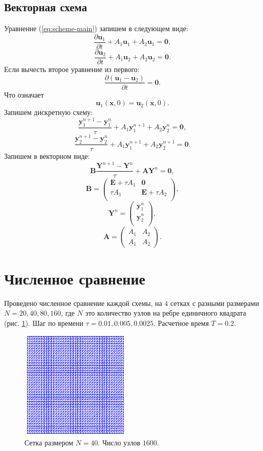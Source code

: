 \documentclass[12pt]{article}
\begin{document}
\subsection{Векторная схема}
Уравнение (\ref{eq:scheme-main}) запишем в следующем виде:
$$\frac{\partial {\bm u}_1}{\partial t} + A_1{\bm u}_1 + A_2{\bm u}_1 = {\bm 0},$$
$$\frac{\partial {\bm u}_2}{\partial t} + A_1{\bm u}_2 + A_2{\bm u}_2 = {\bm 0}.$$
Если вычесть второе уравнение из первого:
$$
\frac{\partial ({\bm u}_1 - {\bm u}_2)}{\partial t} = {\bm 0}.
$$
Что означает $${\bm u}_1 ({\bm x}, 0) = {\bm u}_2 ({\bm x}, 0).$$
Запишем дискретную схему:
$$\frac{{\bm y}_{1}^{n+1} - {\bm y}_{1}^{n} }{\tau} + A_1 {\bm y}_1^{n+1} + A_2 {\bm y}_2^n = {\bm 0},$$
$$\frac{{\bm y}_{2}^{n+1} - {\bm y}_{2}^{n} }{\tau} + A_1 {\bm y}_1^{n+1} + A_2 {\bm y}_2^{n+1} = {\bm 0}.$$
Запишем в векторном виде:
$$
{\bm B}\frac{{\bm Y}^{n+1} - {\bm Y}^{n}}{\tau} + {\bm A} {\bm Y}^n = {\bm 0},
$$
$$
{\bm B} = \left( \begin{array}{cc}
{\bm E} + \tau A_1 & {\bm 0} \\
\tau A_1 & {\bm E} + \tau A_2 \\
\end{array} \right),
$$
$$
{\bm Y}^n = \left(\begin{array}{c}
{\bm y}_1^{n} \\
{\bm y}_2^{n} \\
\end{array}\right),
$$
$$
{\bm A} = \left(
\begin{array}{cc}
A_1 & A_2 \\
A_1 & A_2
\end{array}
\right).
$$



\section{Численное сравнение}
Проведено численное сравнение каждой схемы, на $4$ сетках  с разными размерами $N = 20, 40, 80, 160$, где $N$ это количество узлов на ребре единичного квадрата (рис. \ref{fg:scheme-mesh}). Шаг по времени $\tau = 0.01, 0.005, 0.0025$. Расчетное время $T=0.2$.

\begin{figure}
	\begin{center}
		\includegraphics[width=200px]{pics/mesh}
		\caption{Сетка размером $N=40$. Число узлов $1600$.}
		\label{fg:scheme-mesh}
	\end{center}
\end{figure}
\end{document}
